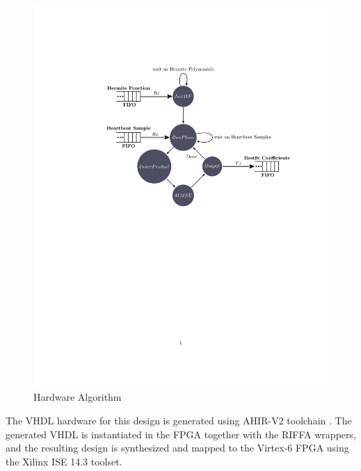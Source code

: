 \documentclass[runningheads]{llncs}
\begin{document}
\begin{figure}
\begin{center}
	\includegraphics[scale=0.80]{stateMachine.pdf}
	\caption{Hardware Algorithm}
	\label{fig:HWAlgorithm}
\end{center}
\end{figure}

The VHDL hardware for this design is generated using AHIR-V2 toolchain \cite{c:ahir_usenix2012}.  
The generated VHDL is instantiated in the FPGA together with the RIFFA wrappers,
and the resulting design is synthesized and mapped to the Virtex-6 FPGA using
the Xilinx ISE 14.3 toolset.


%
%
%
%
\end{document}
